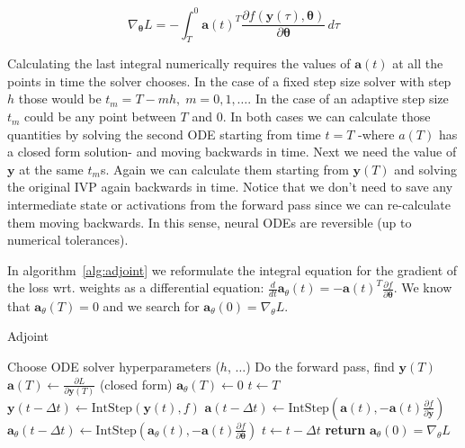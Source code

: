 \documentclass[11pt]{article}
\begin{document}
    \begin{equation*}
        \nabla_{\pmb{\theta}} L =
        - \int_T^0
        \pmb{a}(t)^T
        \frac
        {\partial f(\pmb{y}(\tau), \pmb{\theta})}
        {\partial \pmb{\theta}}
        \, d\tau
    \end{equation*}

    Calculating the last integral numerically requires the values of $\pmb{a}(t)$ at all the points in time the solver chooses.
    In the case of a fixed step size solver with step $h$ those would be $t_m = T - mh, \; m=0,1,\dots$.
    In the case of an adaptive step size $t_m$ could be any point between $T$ and $0$.
    In both cases we can calculate those quantities by solving the second ODE starting from time $t=T$ -where $a(T)$ has a closed form solution- and moving backwards in time.
    Next we need the value of $\pmb{y}$ at the same $t_m$s. Again we can calculate them starting from $\pmb{y}(T)$ and solving the original IVP again backwards in time.
    Notice that we don't need to save any intermediate state or activations from the forward pass since we can re-calculate them moving backwards.
    In this sense, neural ODEs are reversible (up to numerical tolerances).

    In algorithm~\ref{alg:adjoint} we reformulate the integral equation for the gradient of the loss wrt.
    weights as a differential equation: $ \frac{d}{dt} \pmb{a}_\theta(t) = -\pmb{a}(t)^T \frac{\partial f}{\partial \pmb{\theta}}$.
    We know that $\pmb{a}_\theta(T) = 0$ and we search for $\pmb{a}_\theta(0) = \nabla_\theta L$.

    \begin{algorithm}
        \caption{Adjoint}
        \label{alg:adjoint}
        \begin{algorithmic}
            \State Choose ODE solver hyperparameters ($h$, $\dots$)
            \State Do the forward pass, find $\pmb{y}(T)$
            \State $\pmb{a}(T) \gets \frac{\partial L}{\partial \pmb{y}(T)}$ (closed form)
            \State $\pmb{a}_{\theta}(T) \gets 0$
            \State $t \gets T$
                \State $\pmb{y}(t - \Delta t) \gets \text{IntStep}(\pmb{y}(t), f) $
                \State $\pmb{a}(t - \Delta t) \gets \text{IntStep}(
                \pmb{a}(t), -\pmb{a}(t) \frac{\partial f }{\partial \pmb{y}}
                )$
                \State $\pmb{a}_{\theta}(t - \Delta t) \gets \text{IntStep}(
                \pmb{a}_{\theta}(t), -\pmb{a}(t) \frac{\partial f }{\partial \pmb{\theta}}
                )$
                \State $t \gets t - \Delta t$
            \EndWhile
            \State \textbf{return} $\pmb{a}_\theta(0) = \nabla_\theta L$
        \end{algorithmic}
    \end{algorithm}
\end{document}
